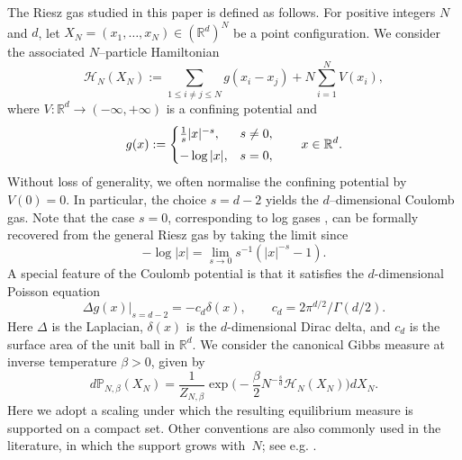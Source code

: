 \documentclass[10pt]{amsart}
\def\R{\mathbb{R}}
\theoremstyle{plain}
\theoremstyle{remark}
\numberwithin{equation}{section}
\begin{document}
The Riesz gas studied in this paper is defined as follows. For positive integers $N$ and $d$, let $X_N=(x_1,\ldots,x_N)\in(\mathbb{R}^d)^N$ be a point configuration.  
We consider the associated $N$–particle Hamiltonian
\begin{equation}  \label{def of Hamiltonian}
\mathcal{H}_N(X_N) := \sum_{1 \le i \ne j \le N} g(x_i - x_j) 
+ N \sum_{i=1}^N V(x_i),
\end{equation}
where $V:\mathbb{R}^d\to(-\infty,+\infty)$ is a confining potential and  
\begin{equation}
\label{eq:g}
g(x)  := \begin{cases}
\frac{1}{s} |x|^{-s}, & s \ne 0, 
\smallskip 
\\
-\log|x|, & s = 0 , 
\end{cases} \qquad x \in \R^d. 
\end{equation} 
Without loss of generality, we often normalise the confining potential by $V(0)=0.$ 
In particular, the choice $s=d-2$ yields the $d$–dimensional Coulomb gas. Note that the case $s=0$, corresponding to log gases \cite{Fo10}, can be formally recovered from the general Riesz gas by taking the limit since
\begin{equation}
-\log |x|= \lim_{s\to 0} s^{-1}( |x|^{-s}-1 ) .
\end{equation} 
A special feature of the Coulomb potential is that it satisfies the $d$-dimensional Poisson equation
\begin{equation}\label{1.3a}
\Delta g(x) |_{s=d-2} = - c_d \delta(x), \qquad c_d = 2 \pi^{d/2}/ \Gamma(d/2).
\end{equation}
Here $\Delta$ is the Laplacian, $\delta(x)$ is the $d$-dimensional Dirac delta, and $c_d$ is the surface area of the unit ball in $\mathbb R^d$.
We consider the canonical Gibbs measure at inverse temperature $\beta>0$, given by 
\begin{equation}
d \mathbb{P}_{N,\beta}(X_N) = \frac{1}{Z_{N,\beta}} \exp\Big(-\frac{\beta}{2} N^{-\frac{s}{d}} \mathcal{H}_N(X_N) \Big) dX_N. 
\end{equation}
Here we adopt a scaling under which the resulting equilibrium measure is supported on a compact set. Other conventions are also commonly used in the literature, in which the support grows with~$N$; see e.g. \cite{ADKKMMS19}.
\end{document}
